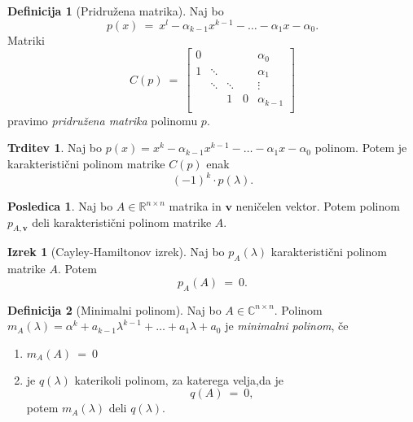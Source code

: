 \documentclass[11pt]{article}
\newcommand{\R}{\mathbb{R}}
\newcommand{\vv}{\mathbf{v}}
\newcommand{\0}{\mathbf{0}}
\theoremstyle{definition}
\newtheorem{definicija}{Definicija}[section]
\theoremstyle{definition}
\newtheorem{trditev}{Trditev}[section]
\theoremstyle{definition}
\newtheorem{izrek}{Izrek}[section]
\theoremstyle{definition}
\newtheorem*{posledica}{Posledica}
\begin{document}
\begin{definicija}[Pridružena matrika]

Naj bo 
$$p(x) ~=~ x^l - \alpha_{k-1} x^{k-1} - \ldots - \alpha_1 x - \alpha_0.$$
Matriki
$$C(p) ~=~ \begin{bmatrix}
0 & ~ & ~ & ~ & \alpha_0 \\
1 & \ddots & ~ & ~ & \alpha_1 \\
~ & \ddots & \ddots & ~ & \vdots \\
~ & ~ & 1 & 0 & \alpha_{k-1} \\
\end{bmatrix}$$
pravimo \textit{pridružena matrika} polinomu $p$.

\end{definicija}
\vspace{0.5cm}

\begin{trditev}

Naj bo $p(x) = x^k - \alpha_{k-1} x^{k-1} - \ldots - \alpha_1 x - \alpha_0$ polinom. Potem je karakteristični polinom matrike $C(p)$ enak
$$(-1)^k \cdot p(\lambda).$$

\end{trditev}
\vspace{0.5cm}

\begin{posledica}

Naj bo $A \in \R^{n \times n}$ matrika in $\vv$ neničelen vektor. Potem polinom $p_{A,\vv}$ deli karakteristični polinom matrike $A$.

\end{posledica}
\vspace{0.5cm}

\begin{izrek}[Cayley-Hamiltonov izrek]

Naj bo $p_A(\lambda)$ karakteristični polinom matrike $A$. Potem 
$$p_A(A) ~=~ 0.$$

\end{izrek}
\vspace{0.5cm}

\begin{definicija}[Minimalni polinom]

Naj bo $A \in \mathbb{C}^{n \times n}$. Polinom $m_A(\lambda) = \alpha^k + a_{k-1}\lambda^{k-1} + \ldots + a_1 \lambda + a_0$ je \textit{minimalni polinom}, če
\begin{enumerate}
	\item $m_A(A) ~=~ 0$
	\item je $q(\lambda)$ katerikoli polinom, za katerega velja,da je
	$$q(A) ~=~ 0,$$
	potem $m_A(\lambda)$ deli $q(\lambda)$.
\end{enumerate} 

\end{definicija}
\vspace{0.5cm}
\end{document}
